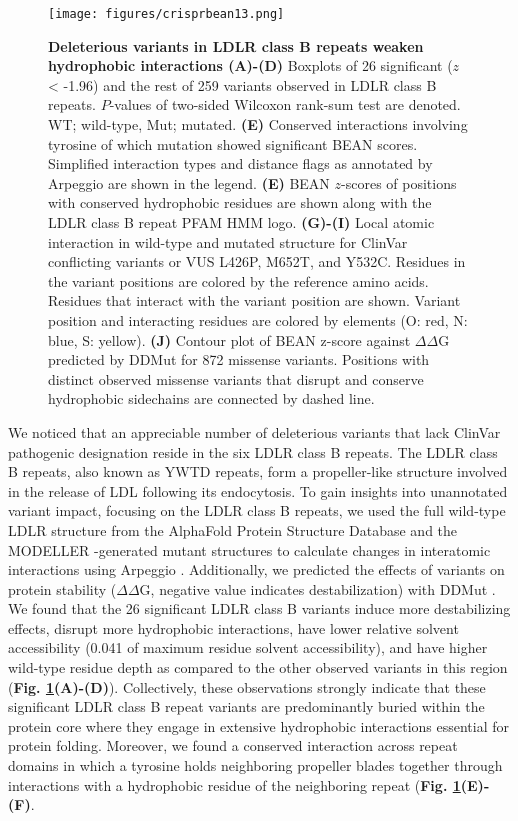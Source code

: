 \documentclass[a4paper, titlepage, openright]{book}
\begin{document}
\begin{figure}
	\centering
	\texttt{[image: figures/crisprbean13.png]}
	\caption[Deleterious variants in LDLR class B repeats weaken hydrophobic interactions]{\textbf{Deleterious variants in LDLR class B repeats weaken hydrophobic interactions (A)-(D)} Boxplots of 26 significant ($z$ < -1.96) and the rest of 259 variants observed in LDLR class B repeats. $P$-values of two-sided Wilcoxon rank-sum test are denoted. WT; wild-type, Mut; mutated. \textbf{(E)} Conserved interactions involving tyrosine of which mutation showed significant BEAN scores. Simplified interaction types and distance flags as annotated by Arpeggio are shown in the legend. \textbf{(E)} BEAN $z$-scores of positions with conserved hydrophobic residues are shown along with the LDLR class B repeat PFAM HMM logo. \textbf{(G)-(I)} Local atomic interaction in wild-type and mutated structure for ClinVar conflicting variants or VUS L426P, M652T, and Y532C. Residues in the variant positions are colored by the reference amino acids. Residues that interact with the variant position are shown. Variant position and interacting residues are colored by elements (O: red, N: blue, S: yellow). \textbf{(J)} Contour plot of BEAN z-score against $\Delta\Delta$G predicted by DDMut for 872 missense variants. Positions with distinct observed missense variants that disrupt and conserve hydrophobic sidechains are connected by dashed line.}
	\label{fig:crisprbean13}
\end{figure} 
We noticed that an appreciable number of deleterious variants that lack ClinVar pathogenic designation reside in the six LDLR class B repeats. The LDLR class B repeats, also known as YWTD repeats, form a propeller-like structure involved in the release of LDL following its endocytosis. To gain insights into unannotated variant impact, focusing on the LDLR class B repeats, we used the full wild-type LDLR structure from the AlphaFold Protein Structure Database \citep{jumper2021highly, varadi2022alphafold} and the MODELLER \citep{webb2016comparative} -generated mutant structures to calculate changes in interatomic interactions using Arpeggio \citep{jubb2017arpeggio}. Additionally, we predicted the effects of variants on protein stability ($\Delta\Delta$G, negative value indicates destabilization) with DDMut \citep{zhou2023ddmut}. We found that the 26 significant LDLR class B variants induce more destabilizing effects, disrupt more hydrophobic interactions, have lower relative solvent accessibility \citep{rose1985hydrophobicity} (0.041 of maximum residue solvent accessibility), and have higher wild-type residue depth as compared to the other observed variants in this region (\textbf{Fig. \ref{fig:crisprbean13}(A)-(D)}). Collectively, these observations strongly indicate that these significant LDLR class B repeat variants are predominantly buried within the protein core where they engage in extensive hydrophobic interactions essential for protein folding. Moreover, we found a conserved interaction across repeat domains in which a tyrosine holds neighboring propeller blades together through interactions with a hydrophobic residue of the neighboring repeat (\textbf{Fig. \ref{fig:crisprbean13}(E)-(F)}. 
\end{document}

